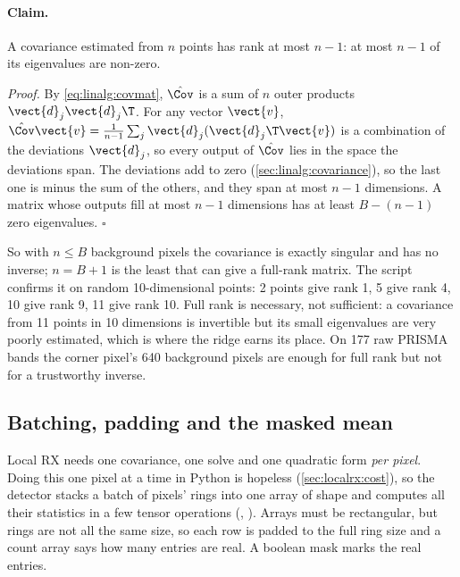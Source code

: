 \paragraph{Claim.} A covariance estimated from $n$ points has rank at most $n - 1$: at most $n - 1$ of
its eigenvalues are non-zero.

\noindent\textit{Proof.} By \cref{eq:linalg:covmat}, $\hat\Cov$ is a sum of $n$ outer products
$\vect{d}_j\vect{d}_j\T$. For any vector $\vect{v}$, $\hat\Cov\vect{v} = \frac{1}{n-1}\sum_j
\vect{d}_j(\vect{d}_j\T\vect{v})$ is a combination of the deviations $\vect{d}_j$, so every output of
$\hat\Cov$ lies in the space the deviations span. The deviations add to zero
(\cref{sec:linalg:covariance}), so the last one is minus the sum of the others, and they span at most
$n - 1$ dimensions. A matrix whose outputs fill at most $n - 1$ dimensions has at least $B - (n - 1)$
zero eigenvalues. \hfill$\square$

So with $n \le B$ background pixels the covariance is exactly singular and has no inverse; $n = B + 1$
is the least that can give a full-rank matrix. The script confirms it on random 10-dimensional points:
2 points give rank 1, 5 give rank 4, 10 give rank 9, 11 give rank 10\tagC. Full rank is necessary, not
sufficient: a covariance from 11 points in 10 dimensions is invertible but its small eigenvalues are
very poorly estimated, which is where the ridge earns its place. On 177 raw PRISMA bands the corner
pixel's 640 background pixels are enough for full rank but not for a trustworthy inverse.

\subsection{Batching, padding and the masked mean}

Local RX needs one covariance, one solve and one quadratic form \emph{per pixel}. Doing this one pixel
at a time in Python is hopeless (\cref{sec:localrx:cost}), so the detector stacks a batch of pixels'
rings into one array of shape  and computes all their statistics in a few tensor
operations (, ). Arrays must be
rectangular, but rings are not all the same size, so each row is padded to the full ring size
 and a count array  says how many entries are real. A boolean mask
 marks the real entries.

